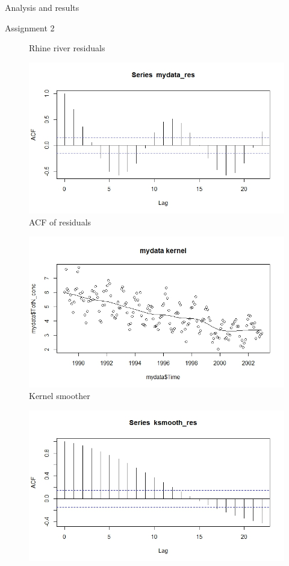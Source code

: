 \documentclass{article}
\begin{document}
\begin{section}{Analysis and results}
\begin{subsection}{Assignment 2}
\begin{figure}[ht!]
    \caption{Rhine river residuals}
    \label{fig:mydata_res}
\end{figure}
\begin{figure}[ht!]
    \centering
    \includegraphics[scale=0.4]{mydata_resACF}
    \caption{ACF of residuals}
    \label{fig:mydata_resACF}
\end{figure}
\begin{figure}[ht!]
    \centering
    \includegraphics[scale=0.4]{mydata_kernel}
    \caption{Kernel smoother}
    \label{fig:mydata_kernel}
\end{figure}
\begin{figure}[ht!]
    \centering
    \includegraphics[scale=0.4]{ksmooth_res}

\end{figure}
\end{subsection}
\end{section}
\end{document}

